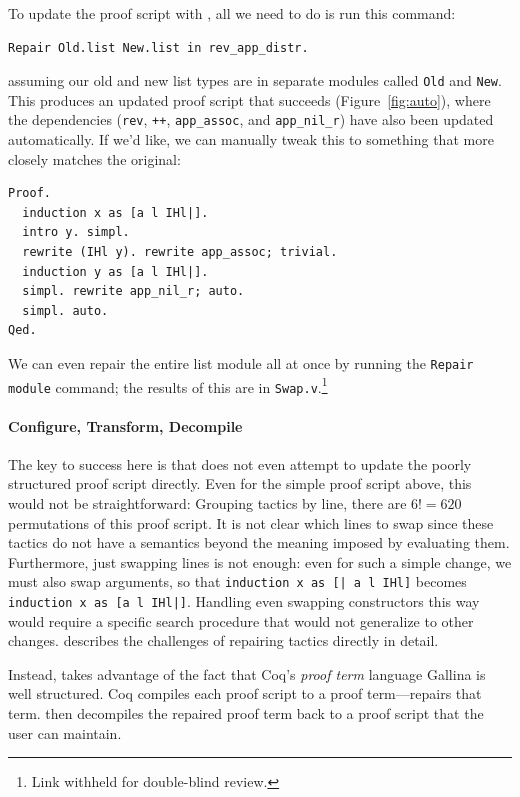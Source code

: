 To update the proof script with \toolname, all we need to do is run this command:

\begin{lstlisting}
Repair Old.list New.list in rev_app_distr.
\end{lstlisting}
assuming our old and new list types are in separate modules called \lstinline{Old} and \lstinline{New}.
This produces an updated proof script that succeeds (Figure~\ref{fig:auto}),
where the dependencies (\lstinline{rev}, \lstinline{++}, \lstinline{app_assoc}, and \lstinline{app_nil_r}) have
also been updated automatically.
If we'd like, we can manually tweak this to something that more closely matches the original:

\begin{lstlisting}
Proof.
  induction x as [a l IHl|].
  intro y. simpl.
  rewrite (IHl y). rewrite app_assoc; trivial.
  induction y as [a l IHl|].
  simpl. rewrite app_nil_r; auto.
  simpl. auto.
Qed.
\end{lstlisting}
We can even repair the entire list module all at once by running the \lstinline{Repair module}
command; the results of this are in \lstinline{Swap.v}.\footnote{Link withheld for double-blind review.} %

\paragraph{Configure, Transform, Decompile}
The key to success here is that \toolname does not even attempt to update the poorly structured proof script directly.
Even for the simple proof script above, this would not be straightforward: Grouping tactics by line, there are $6! = 620$
permutations of this proof script.
It is not clear which lines to swap since these tactics do not have a semantics beyond the meaning imposed by evaluating them.
Furthermore, just swapping lines is not enough: even for such a simple change, we must also swap
arguments, so that \lstinline{induction x as [| a l IHl]} becomes \lstinline{induction x as [a l IHl|]}.
Handling even swapping constructors this way would require a specific search procedure that would not generalize to other changes.
\citet{robert2018} describes the challenges of repairing tactics directly in detail.

Instead, \toolname takes advantage of the fact that Coq's \textit{proof term} language Gallina is well structured.
Coq compiles each proof script to a proof term---\toolname repairs that term.
\toolname then decompiles the repaired proof term back to a proof script that the user can maintain.

